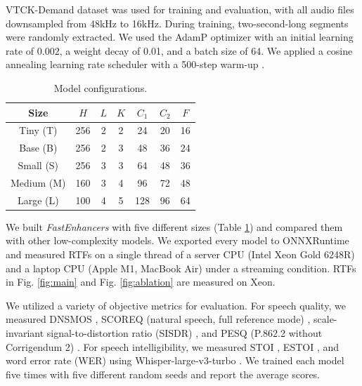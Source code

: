 VTCK-Demand dataset \cite{vctk-demand} was used for training and evaluation, with all audio files downsampled from 48kHz to 16kHz. During training, two-second-long segments were randomly extracted. We used the AdamP optimizer \cite{adamp} with an initial learning rate of 0.002, a weight decay of 0.01, and a batch size of 64. We applied a cosine annealing learning rate scheduler with a 500-step warm-up \cite{coslr}.

\begin{table}
    \vspace{-5pt}
    \caption{Model configurations.}
    \label{table:config}
    \centering
    \begin{tabular}{c|c|c|c|c|c|c}
        \hline
        Size & $H$ & $L$ & $K$ & $C_1$ & $C_2$ & $F$ \\
        \hline
        Tiny (T) & 256 & 2 & 2 & 24 & 20 & 16 \\
        Base (B) & 256 & 2 & 3 & 48 & 36 & 24 \\
        Small (S) & 256 & 3 & 3 & 64 & 48 & 36 \\
        Medium (M) & 160 & 3 & 4 & 96 & 72 & 48 \\
        Large (L) & 100 & 4 & 5 & 128 & 96 & 64 \\
        \hline
    \end{tabular}
\end{table}

We built \textit{FastEnhancers} with five different sizes (Table \ref{table:config}) and compared them with other low-complexity models. We exported every model to ONNXRuntime \cite{onnxruntime} and measured RTFs on a single thread of a server CPU (Intel Xeon Gold 6248R) and a laptop CPU (Apple M1, MacBook Air) under a streaming condition. RTFs in Fig. \ref{fig:main} and Fig. \ref{fig:ablation} are measured on Xeon.

We utilized a variety of objective metrics for evaluation. For speech quality, we measured DNSMOS \cite{dnsmos-p.808} \cite{dnsmos-p.835}, SCOREQ (natural speech, full reference mode) \cite{scoreq}, scale-invariant signal-to-distortion ratio (SISDR) \cite{sisdr}, and PESQ (P.862.2 without Corrigendum 2) \cite{pesq}. For speech intelligibility, we measured STOI \cite{stoi}, ESTOI \cite{estoi}, and word error rate (WER) using Whisper-large-v3-turbo \cite{whisper}. We trained each model five times with five different random seeds and report the average scores.